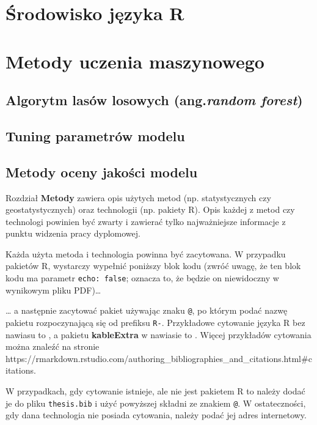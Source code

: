 \documentclass{amuthesis}
\begin{document}
\hypertarget{sec-r}{%
\section{Środowisko języka R}\label{sec-r}}

\hypertarget{sec-ml}{%
\section{Metody uczenia maszynowego}\label{sec-ml}}

\hypertarget{sec-rf}{%
\subsection{\texorpdfstring{Algorytm lasów losowych (ang.\emph{random
forest})}{Algorytm lasów losowych (ang.random forest)}}\label{sec-rf}}

\hypertarget{sec-tuning}{%
\subsection{Tuning parametrów modelu}\label{sec-tuning}}

\hypertarget{sec-resampling}{%
\subsection{Metody oceny jakości modelu}\label{sec-resampling}}

Rozdział \textbf{Metody} zawiera opis użytych metod (np. statystycznych
czy geostatystycznych) oraz technologii (np. pakiety R). Opis każdej z
metod czy technologi powinien być zwarty i zawierać tylko najważniejsze
informacje z punktu widzenia pracy dyplomowej.

Każda użyta metoda i technologia powinna być zacytowana. W przypadku
pakietów R, wystarczy wypełnić poniższy blok kodu (zwróć uwagę, że ten
blok kodu ma parametr \texttt{echo:\ false}; oznacza to, że będzie on
niewidoczny w wynikowym pliku PDF)\ldots{}

\ldots{} a następnie zacytować pakiet używając znaku \texttt{@}, po
którym podać nazwę pakietu rozpoczynającą się od prefiksu \texttt{R-}.
Przykładowe cytowanie języka R bez nawiasu to \textcite{R-base}, a
pakietu \textbf{kableExtra} w nawiasie to \autocite{R-kableExtra}.
Więcej przykładów cytowania można znaleźć na stronie
https://rmarkdown.rstudio.com/authoring\_bibliographies\_and\_citations.html\#citations.

W przypadkach, gdy cytowanie istnieje, ale nie jest pakietem R to należy
dodać je do pliku \texttt{thesis.bib} i użyć powyższej składni ze
znakiem \texttt{@}. W ostateczności, gdy dana technologia nie posiada
cytowania, należy podać jej adres internetowy.
\end{document}
